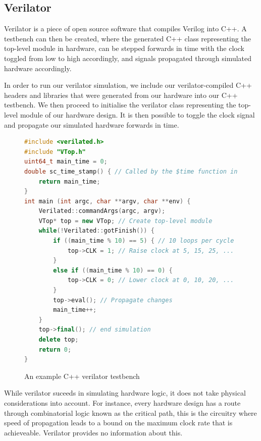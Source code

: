 \documentclass[a4paper,8pt]{report}
\begin{document}
\subsection{Verilator}
Verilator is a piece of open source software that compiles Verilog into C++. A
testbench can then be created, where the generated C++ class representing the
top-level module in hardware, can be stepped forwards in time with the clock
toggled from low to high accordingly, and signals propagated through simulated
hardware accordingly.

In order to run our verilator simulation, we include our verilator-compiled C++
headers and libraries that were generated from our hardware into our C++
testbench. We then proceed to initialise the verilator class representing the
top-level module of our hardware design. It is then possible to toggle the clock
signal and propagate our simulated hardware forwards in time.
\begin{figure}[h]
\begin{lstlisting}[language=C++,style=customcpp,xleftmargin=.05\textwidth]
#include <verilated.h>
#include "VTop.h"
uint64_t main_time = 0;
double sc_time_stamp() { // Called by the $time function in Verilog
    return main_time;
}
int main (int argc, char **argv, char **env) {
    Verilated::commandArgs(argc, argv);
    VTop* top = new VTop; // Create top-level module
    while(!Verilated::gotFinish()) {
        if ((main_time % 10) == 5) { // 10 loops per cycle
            top->CLK = 1; // Raise clock at 5, 15, 25, ...
        }
        else if ((main_time % 10) == 0) {
            top->CLK = 0; // Lower clock at 0, 10, 20, ...
        }
        top->eval(); // Propagate changes
        main_time++;
    }
    top->final(); // end simulation
    delete top;
    return 0;
}

\end{lstlisting}
\caption{An example C++ verilator testbench}
\end{figure}

While verilator suceeds in simulating hardware logic, it does not take physical
considerations into account. For instance, every hardware design has a route through
combinatorial logic known as the critical path, this is the circuitry where
speed of propagation leads to a bound on the maximum clock rate that is
achieveable. Verilator provides no information about this.

\end{document}
